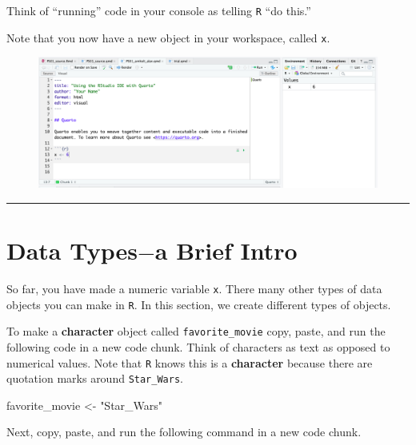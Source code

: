 \documentclass[
  letterpaper,
  DIV=11,
  numbers=noendperiod]{scrartcl}
\newenvironment{Shaded}{\begin{snugshade}}{\end{snugshade}}
\newcommand{\NormalTok}[1]{\textcolor[rgb]{0.00,0.23,0.31}{#1}}
\newcommand{\OtherTok}[1]{\textcolor[rgb]{0.00,0.23,0.31}{#1}}
\newcommand{\StringTok}[1]{\textcolor[rgb]{0.13,0.47,0.30}{#1}}
\begin{document}
Think of ``running'' code in your console as telling \texttt{R} ``do
this.''

Note that you now have a new object in your workspace, called
\texttt{x}.

\begin{figure}

{\centering \includegraphics[width=9.75in,height=\textheight]{figures/quarto-workspace.png}

}

\end{figure}

\begin{center}\rule{0.5\linewidth}{0.5pt}\end{center}

\hypertarget{data-types-a-brief-intro}{%
\section{\texorpdfstring{Data Types\(-\)a Brief
Intro}{Data Types-a Brief Intro}}\label{data-types-a-brief-intro}}

So far, you have made a numeric variable \texttt{x}. There many other
types of data objects you can make in \texttt{R}. In this section, we
create different types of objects.

To make a \textbf{character} object called \texttt{favorite\_movie}
copy, paste, and run the following code in a new code chunk. Think of
characters as text as opposed to numerical values. Note that \texttt{R}
knows this is a \textbf{character} because there are quotation marks
around \texttt{Star\_Wars}.

\begin{Shaded}
\begin{Highlighting}[]
\NormalTok{favorite\_movie }\OtherTok{\textless{}{-}} \StringTok{"Star\_Wars"}
\end{Highlighting}
\end{Shaded}

Next, copy, paste, and run the following command in a new code chunk.
\end{document}

